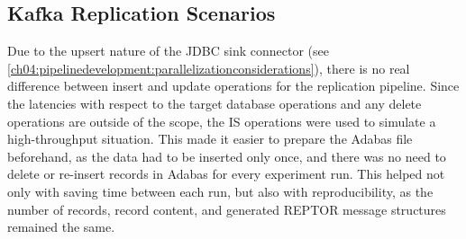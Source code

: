 \subsection{Kafka Replication Scenarios}
\label{ch05:methodology:design:scenarios}
Due to the upsert nature of the \ac{JDBC} sink connector (see \ref{ch04:pipelinedevelopment:parallelizationconsiderations}), there is no real difference between insert and update operations for the replication pipeline. Since the latencies with respect to the target database operations and any delete operations are outside of the scope, the \ac{IS} operations were used to simulate a high-throughput situation. This made it easier to prepare the Adabas file beforehand, as the data had to be inserted only once, and there was no need to delete or re-insert records in Adabas for every experiment run. This helped not only with saving time between each run, but also with reproducibility, as the number of records, record content, and generated \ac{REPTOR} message structures remained the same.

